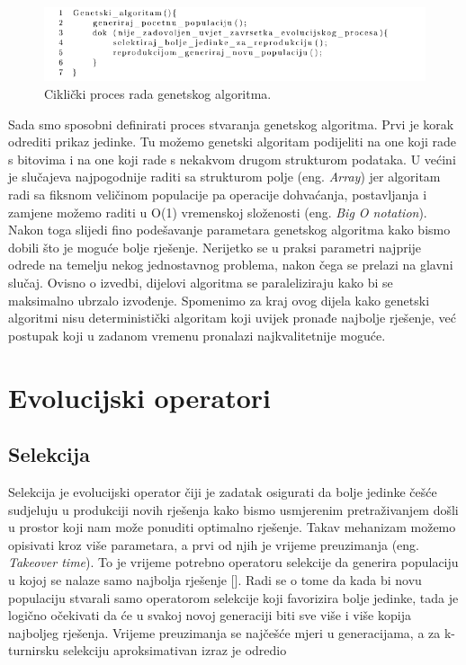 \documentclass[times, utf8, zavrsni]{fer}
\begin{document}
	\begin{figure}[!htb]
		\centering
		\includegraphics[width=15cm]{slike/nenrGenAlg.png}
		\caption{Ciklički proces rada genetskog algoritma. }
		\label{fig:nenr-alg}
	\end{figure}
	
	
	Sada smo sposobni definirati proces stvaranja genetskog algoritma. Prvi je korak odrediti prikaz jedinke. Tu možemo genetski algoritam podijeliti na one koji rade s bitovima i na one koji rade s nekakvom drugom strukturom podataka. U većini je slučajeva najpogodnije raditi sa strukturom polje (eng. \emph{Array}) jer algoritam radi sa fiksnom veličinom populacije pa operacije dohvaćanja, postavljanja i zamjene možemo raditi u O(1) vremenskoj složenosti (eng. \emph{Big O notation}). Nakon toga slijedi fino podešavanje parametara genetskog algoritma kako bismo dobili što je moguće bolje rješenje. Nerijetko se u praksi parametri najprije odrede na temelju nekog jednostavnog problema, nakon čega se prelazi na glavni slučaj. Ovisno o izvedbi, dijelovi algoritma se paraleliziraju kako bi se maksimalno ubrzalo izvođenje. Spomenimo za kraj ovog dijela kako genetski algoritmi nisu deterministički algoritam koji uvijek pronađe najbolje rješenje, već postupak koji u zadanom vremenu pronalazi najkvalitetnije moguće. 
	
	\section{Evolucijski operatori}
	
	\subsection{Selekcija}
	\label{selekcija}
	
	Selekcija je evolucijski operator čiji je zadatak osigurati da bolje jedinke češće sudjeluju u produkciji novih rješenja kako bismo usmjerenim pretraživanjem došli u prostor koji nam može ponuditi optimalno rješenje. Takav mehanizam možemo opisivati kroz više parametara, a prvi od njih je vrijeme preuzimanja (eng. \emph{Takeover time}). To je vrijeme potrebno operatoru selekcije da generira populaciju u kojoj se nalaze samo najbolja rješenje [\citet{GoldAndDeb}]. Radi se o tome da kada bi novu populaciju stvarali samo operatorom selekcije koji favorizira bolje jedinke, tada je logično očekivati da će u svakoj novoj generaciji biti sve više i više kopija najboljeg rješenja. Vrijeme preuzimanja se najčešće mjeri u generacijama, a za k-turnirsku selekciju aproksimativan izraz je odredio \citet{EvAlgsinTheoryAndPractise} 
	
\end{document}
